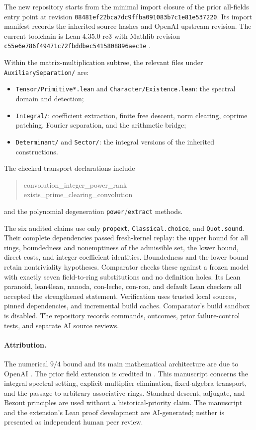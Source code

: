\documentclass[11pt]{article}
\theoremstyle{remark}
\numberwithin{equation}{section}
\begin{document}
The new repository \cite{Rings} starts from the minimal import closure
of the prior all-fields entry point at revision
\texttt{08481ef22bca7dc9ffba091083b7c1e81e537220}. Its import manifest
records the inherited source hashes and OpenAI upstream revision.
The current toolchain is Lean 4.35.0-rc3 with Mathlib revision
\texttt{c55e6e786f49471c72fbddbec5415808896aec1e}
\cite{Lean,Mathlib}.

Within the matrix-multiplication subtree, the relevant files under
\nolinkurl{AuxiliarySeparation/} are:
\begin{itemize}
\item \nolinkurl{Tensor/Primitive*.lean} and
\nolinkurl{Character/Existence.lean}: the spectral domain and detection;
\item \nolinkurl{Integral/}: coefficient extraction,
finite free descent, norm clearing, coprime patching, Fourier separation,
and the arithmetic bridge;
\item \nolinkurl{Determinant/} and
\nolinkurl{Sector/}: the integral versions of the inherited constructions.
\end{itemize}
The checked transport declarations include
\begin{quote}\small\ttfamily
convolution\_integer\_power\_rank\\
exists\_prime\_clearing\_convolution
\end{quote}
and the polynomial degeneration \texttt{power}/\texttt{extract} methods.

The six audited claims use only \texttt{propext}, \texttt{Classical.choice},
and \texttt{Quot.sound}. Their complete dependencies passed fresh-kernel
replay: the upper bound for all rings, boundedness and nonemptiness of the
admissible set, the lower bound, direct costs, and integer coefficient
identities. Boundedness and the lower bound retain nontriviality hypotheses.
Comparator checks these against a frozen model with exactly seven
field-to-ring substitutions and no definition holes. Its Lean paranoid,
lean4lean, nanoda, con-leche, con-ron, and default Lean checkers all accepted
the strengthened statement.
Verification uses trusted local sources, pinned dependencies, and incremental
build caches. Comparator's build sandbox is disabled. The repository records
commands, outcomes, prior failure-control tests, and separate AI source reviews.

\paragraph{Attribution.}
The numerical $9/4$ bound and its main mathematical architecture are due
to OpenAI \cite{OAI,OAILean}. The prior field extension is credited in
\cite{Fields}. This manuscript concerns the integral spectral setting,
explicit multiplier elimination, fixed-algebra transport, and the passage
to arbitrary associative rings. Standard descent, adjugate, and Bezout
principles are used without a historical-priority claim. The manuscript
and the extension's Lean proof development are AI-generated; neither is
presented as independent human peer review.
\end{document}
